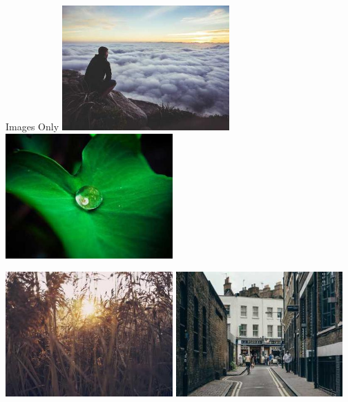 \documentclass[aspectratio=169, notes]{beamer}
\begin{document}
{
    \newcommand{\imgheight}{0.35\textheight} %
    \begin{frame}{Images Only}
        \centering
        \includegraphics[width=0.48\textwidth, height=\imgheight, keepaspectratio]{Images/image1.jpg}
        \includegraphics[width=0.48\textwidth, height=\imgheight, keepaspectratio]{Images/image2.jpg}

        \includegraphics[width=0.48\textwidth, height=\imgheight, keepaspectratio]{Images/image3.jpg}
        \includegraphics[width=0.48\textwidth, height=\imgheight, keepaspectratio]{Images/image4.jpg}
    \end{frame}
}
\end{document}

